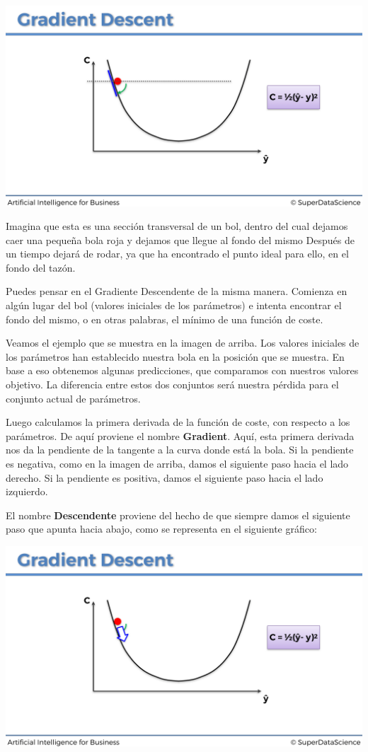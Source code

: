 \documentclass[
]{book}
\begin{document}
\includegraphics{Images/ANN_20.png}

Imagina que esta es una sección transversal de un bol, dentro del cual dejamos caer una pequeña bola roja y dejamos que llegue al fondo del mismo Después de un tiempo dejará de rodar, ya que ha encontrado el punto ideal para ello, en el fondo del tazón.

Puedes pensar en el Gradiente Descendente de la misma manera. Comienza en algún lugar del bol (valores iniciales de los parámetros) e intenta encontrar el fondo del mismo, o en otras palabras, el mínimo de una función de coste.

Veamos el ejemplo que se muestra en la imagen de arriba. Los valores iniciales de los parámetros han establecido nuestra bola en la posición que se muestra. En base a eso obtenemos algunas predicciones, que comparamos con nuestros valores objetivo. La diferencia entre estos dos conjuntos será nuestra pérdida para el conjunto actual de parámetros.

Luego calculamos la primera derivada de la función de coste, con respecto a los parámetros. De aquí proviene el nombre \textbf{Gradient}. Aquí, esta primera derivada nos da la pendiente de la tangente a la curva donde está la bola. Si la pendiente es negativa, como en la imagen de arriba, damos el siguiente paso hacia el lado derecho. Si la pendiente es positiva, damos el siguiente paso hacia el lado izquierdo.

El nombre \textbf{Descendente} proviene del hecho de que siempre damos el siguiente paso que apunta hacia abajo, como se representa en el siguiente gráfico:

\includegraphics{Images/ANN_21.png}
\end{document}
